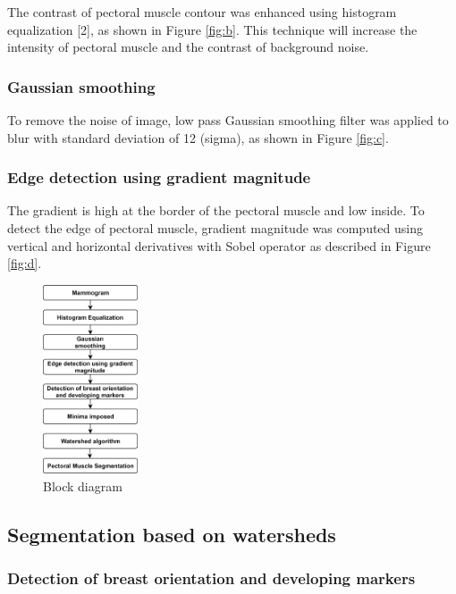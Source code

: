 \documentclass{article}
\begin{document}
The contrast of pectoral muscle contour was enhanced using histogram equalization [2], as shown in Figure \ref{fig:b}. This technique will increase the intensity of pectoral muscle and the contrast of background noise.

\subsubsection{Gaussian smoothing}
\label{sssec:gaus_smooth}

To remove the noise of image, low pass Gaussian smoothing filter was applied to blur with standard deviation of 12 (sigma), as shown in Figure \ref{fig:c}.

\subsubsection{Edge detection using gradient magnitude}
\label{sssec:grad_mag}

The gradient is high at the border of the pectoral muscle and low inside. To detect the edge of pectoral muscle, gradient magnitude was computed using vertical and horizontal derivatives with Sobel operator as described in Figure \ref{fig:d}.

\begin{figure}[h!]
    \centering
    \includegraphics[width=0.25\textwidth]{images/block_diag.jpg} 
    \caption{Block diagram}
    \label{fig:block_diag}
\end{figure} 

\subsection{Segmentation based on watersheds}
\label{ssec:segmen_water}

\subsubsection{Detection of breast orientation and developing markers}
\label{sssec:orien_marker}
\end{document}
